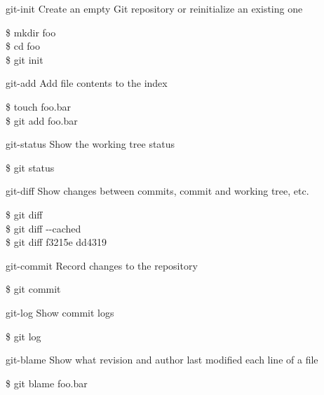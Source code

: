 \documentclass{beamer}
\begin{document}
\begin{frame}{git-init}
  Create an empty Git repository or reinitialize an existing one
  \begin{Example}
    \$ mkdir foo \\
    \$ cd foo \\
    \$ git init
  \end{Example}
\end{frame}

\begin{frame}{git-add}
  Add file contents to the index
  \begin{Example}
    \$ touch foo.bar \\
    \$ git add foo.bar
  \end{Example}
\end{frame}

\begin{frame}{git-status}
  Show the working tree status
  \begin{Example}
    \$ git status
  \end{Example}
\end{frame}

\begin{frame}{git-diff}
  Show changes between commits, commit and working tree, etc.
  \begin{Example}
    \$ git diff \\
    \$ git diff -{}-cached \\
    \$ git diff f3215e dd4319
  \end{Example}
\end{frame}

\begin{frame}{git-commit}
  Record changes to the repository
  \begin{Example}
    \$ git commit
  \end{Example}
\end{frame}

\begin{frame}{git-log}
  Show commit logs
  \begin{Example}
    \$ git log
  \end{Example}
\end{frame}

\begin{frame}{git-blame}
  Show what revision and author last modified each line of a file
  \begin{Example}
    \$ git blame foo.bar
  \end{Example}
\end{frame}
\end{document}
